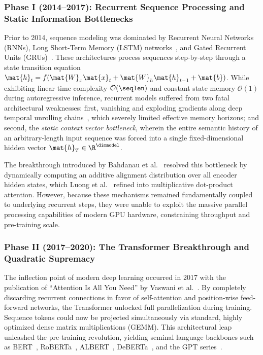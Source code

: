 \subsubsection{Phase I (2014–2017): Recurrent Sequence Processing and Static Information Bottlenecks}
\label{subsubsec:phase1}

Prior to 2014, sequence modeling was dominated by Recurrent Neural Networks (RNNs), Long Short-Term Memory (LSTM) networks~\cite{hochreiter1997long}, and Gated Recurrent Units (GRUs)~\cite{cho2014learning}.
These architectures process sequences step-by-step through a state transition equation $\mat{h}_t = f(\mat{W}_x \mat{x}_t + \mat{W}_h \mat{h}_{t-1} + \mat{b})$.
While exhibiting linear time complexity $\mathcal{O}(\seqlen)$ and constant state memory $\mathcal{O}(1)$ during autoregressive inference, recurrent models suffered from two fatal architectural weaknesses:
first, vanishing and exploding gradients along deep temporal unrolling chains~\cite{rumelhart1986learning}, which severely limited effective memory horizons; and second, the \emph{static context vector bottleneck}, wherein the entire semantic history of an arbitrary-length input sequence was forced into a single fixed-dimensional hidden vector $\mat{h}_T \in \R^{\dimmodel}$.

The breakthrough introduced by Bahdanau et al.~\cite{bahdanau2014neural} resolved this bottleneck by dynamically computing an additive alignment distribution over all encoder hidden states, which Luong et al.~\cite{luong2015effective} refined into multiplicative dot-product attention.
However, because these mechanisms remained fundamentally coupled to underlying recurrent steps, they were unable to exploit the massive parallel processing capabilities of modern GPU hardware, constraining throughput and pre-training scale.

\subsubsection{Phase II (2017–2020): The Transformer Breakthrough and Quadratic Supremacy}
\label{subsubsec:phase2}

The inflection point of modern deep learning occurred in 2017 with the publication of ``Attention Is All You Need'' by Vaswani et al.~\cite{vaswani2017attention}.
By completely discarding recurrent connections in favor of self-attention and position-wise feed-forward networks, the Transformer unlocked full parallelization during training.
Sequence tokens could now be projected simultaneously via standard, highly optimized dense matrix multiplications (GEMM).
This architectural leap unleashed the pre-training revolution, yielding seminal language backbones such as BERT~\cite{devlin2019bert}, RoBERTa~\cite{liu2019roberta}, ALBERT~\cite{lan2020albert}, DeBERTa~\cite{he2021deberta}, and the GPT series~\cite{radford2019language}.

